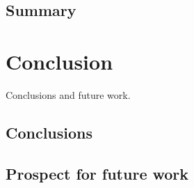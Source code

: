 \documentclass[
  oneside,
  11pt, a4paper,
  footinclude=true,
  headinclude=true,
  cleardoublepage=empty
]{scrbook}
\begin{document}
	\section{Summary}

	\chapter{Conclusion}
	Conclusions and future work.
	\section{Conclusions}
	\section{Prospect for future work}
			
	\cleardoublepage

	
\end{document}
